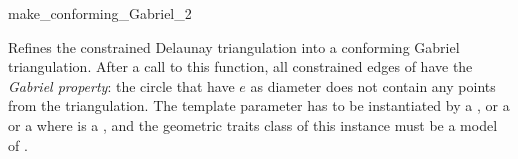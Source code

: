 \begin{ccRefFunction}{make_conforming_Gabriel_2}


{ Refines the constrained Delaunay triangulation  into a
  conforming Gabriel triangulation. After a call to this function, all
  constrained edges of  have the \emph{Gabriel property}: the
  circle that have $e$ as diameter does not contain any points from
  the triangulation.
  \ccPrecond The template parameter  has to be instantiated
  by a , or a
   or a
   where  is a
  , and the
  geometric traits class of this instance must be a model of
  . }

\end{ccRefFunction}

